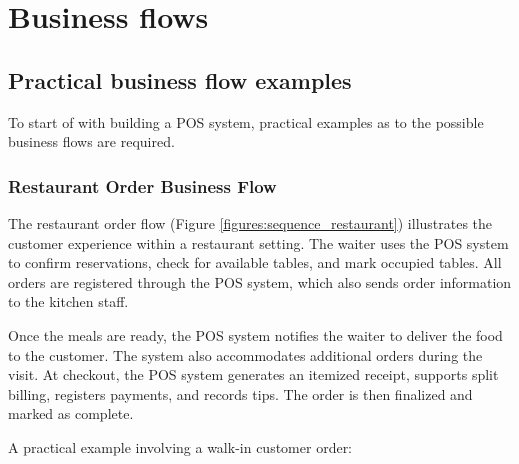 \documentclass[11pt,a4paper,pdftex]{article}
\begin{document}
\section{Business flows}
\subsection{Practical business flow examples}
To start of with building a POS system, practical examples as to the possible business flows are required.

\subsubsection{Restaurant Order Business Flow}
The restaurant order flow (Figure \ref{figures:sequence_restaurant}) illustrates the customer experience within a restaurant setting. The waiter uses the POS system to confirm reservations, check for available tables, and mark occupied tables. All orders are registered through the POS system, which also sends order information to the kitchen staff.

Once the meals are ready, the POS system notifies the waiter to deliver the food to the customer. The system also accommodates additional orders during the visit. At checkout, the POS system generates an itemized receipt, supports split billing, registers payments, and records tips. The order is then finalized and marked as complete. 

A practical example involving a walk-in customer order:
\end{document}
